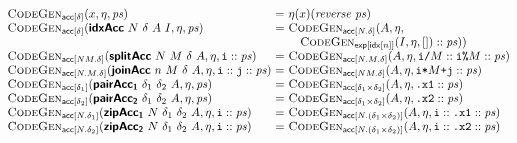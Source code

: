 \begin{figure}
    \bigskip
  
    \begin{minipage}{1.0\linewidth}
      \begin{displaymath}
        \begin{array}{@{}l@{~}c@{~}l@{}}
          \codegenAcc{\delta}{x, \eta, \mathit{ps}}
          &=& \eta(x)(\mathit{reverse}~\mathit{ps})
          \\
          \codegenAcc{\mathsf{\delta}}{\prim{idxAcc}~N~\delta~A~I, \eta, \mathit{ps}}
          &=& \begin{array}[t]{@{}l}
            \codegenAcc{N.\delta}{A, \eta,\\ \quad\codegenExp{\tyidx[n]}{I, \eta, []} :: \mathit{ps})}
          \end{array}
          \\
          \codegenAcc{NM.\delta}{\prim{splitAcc}~N~M~\delta~A, \eta, \texttt{i} :: \mathit{ps}}
          &=& \codegenAcc{N.M.\delta}{A, \eta, \texttt{i/}M :: \texttt{i\%}M :: \mathit{ps}}
          \\
          \codegenAcc{N.M.\delta}{\prim{joinAcc}~n~M~\delta~A, \eta, \texttt{i} :: \texttt{j} :: \mathit{ps}}
          &=& \codegenAcc{NM.\delta}{A, \eta, \texttt{i*}M\texttt{+j} :: \mathit{ps}}
          \\
          \codegenAcc{\delta_1}{\prim{pairAcc_1}~\delta_1~\delta_2~A, \eta, \mathit{ps}}
          &=& \codegenAcc{\delta_1\times\delta_2}{A, \eta, \texttt{.x1} :: \mathit{ps}}
          \\
          \codegenAcc{\delta_2}{\prim{pairAcc_2}~\delta_1~\delta_2~A, \eta, \mathit{ps}}
          &=& \codegenAcc{\delta_1\times\delta_2}{A, \eta, \texttt{.x2} :: \mathit{ps}}
          \\
          \codegenAcc{N.\delta_1}{\prim{zipAcc_1}~N~\delta_1~\delta_2~A, \eta, \texttt{i} :: \mathit{ps}}
          &=& \codegenAcc{N.(\delta_1\times\delta_2)}{A, \eta, \texttt{i} :: \texttt{.x1} :: \mathit{ps}}
          \\
          \codegenAcc{N.\delta_2}{\prim{zipAcc_2}~N~\delta_1~\delta_2~A, \eta, \texttt{i} :: \mathit{ps}}
          &=& \codegenAcc{N.(\delta_1\times\delta_2)}{A, \eta, \texttt{i} :: \texttt{.x2} :: \mathit{ps}}
        \end{array}
      \end{displaymath}
      \label{fig:codegen-acc}
    \end{minipage}
  
    \bigskip
  

\end{figure}
